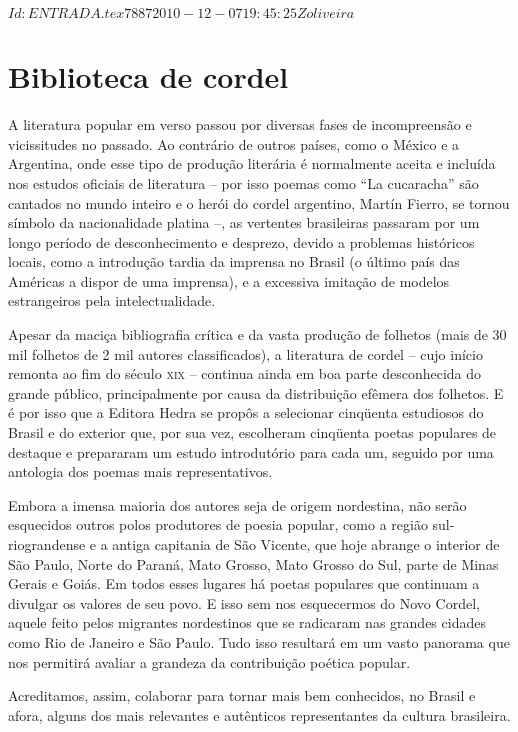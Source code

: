 \SVN $Id: ENTRADA.tex 7887 2010-12-07 19:45:25Z oliveira $

\vspace*{.15\textheight}

\section{Biblioteca de cordel}


A literatura popular em verso passou por diversas fases de incompreensão e
vicissitudes no passado. Ao contrário de outros países, como o México e a
Argentina, onde esse tipo de produção literária é normalmente aceita e incluída
nos estudos oficiais de literatura -- por isso poemas como ``La cucaracha'' são
cantados no mundo inteiro e o herói do cordel argentino, Martín Fierro, se
tornou símbolo da nacionalidade platina \mbox{--,} as vertentes brasileiras passaram por
um longo período de desconhecimento e desprezo, devido a problemas históricos
locais, como a introdução tardia da imprensa no Brasil (o último país das
Américas a dispor de uma imprensa), e a excessiva imitação de modelos
estrangeiros pela intelectualidade. 

Apesar da maciça bibliografia crítica e da vasta produção de folhetos (mais de
30 mil folhetos de 2 mil autores classificados), a literatura de cordel -- cujo
início remonta ao fim do século \textsc{xix} -- continua ainda em boa parte desconhecida
do grande público, principalmente por causa da distribuição efêmera dos
folhetos. E é por isso que a Editora Hedra se propôs a selecionar cinqüenta
estudiosos do Brasil e do exterior que, por sua vez, escolheram cinqüenta poetas
populares de destaque e prepararam um estudo introdutório para cada um, seguido
por uma antologia dos poemas mais representativos. 

Embora a imensa maioria dos autores seja de origem nordestina, não serão
esquecidos outros polos produtores de poesia popular, como a região
sul-riograndense e a antiga capitania de São Vicente, que hoje abrange o
interior de São Paulo, Norte do Paraná, Mato Grosso, Mato Grosso do Sul, parte
de Minas Gerais e Goiás. Em todos esses lugares há poetas populares que
continuam a divulgar os valores de seu povo. E isso sem nos esquecermos do Novo
Cordel, aquele feito pelos migrantes nordestinos que se radicaram nas grandes
cidades como Rio de Janeiro e São Paulo. Tudo isso resultará em um vasto
panorama que nos permitirá avaliar a grandeza da contribuição poética popular. 

Acreditamos, assim, colaborar para tornar mais bem conhecidos, no Brasil e afora,
alguns dos mais relevantes e autênticos representantes da cultura brasileira. 

